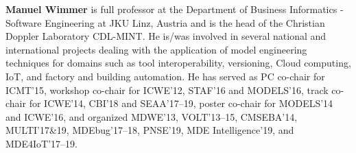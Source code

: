 \noindent
\textbf{Manuel Wimmer} is full professor at the Department of Business Informatics - Software Engineering at JKU Linz, Austria and is the head of the Christian Doppler Laboratory CDL-MINT. %
He is/was involved in several national and international projects dealing with the application of model engineering techniques for domains such as tool interoperability, versioning, Cloud computing, IoT, and factory and building automation. 
He has served as PC co-chair for ICMT'15, workshop co-chair for ICWE'12, STAF'16 and MODELS'16, track co-chair for ICWE'14, CBI'18 and SEAA'17--19, poster co-chair for MODELS'14 and ICWE'16, and organized MDWE'13, VOLT'13--15, CMSEBA'14, MULTI'17\&19, MDEbug'17--18, PNSE'19, MDE Intelligence'19, and MDE4IoT'17--19.

